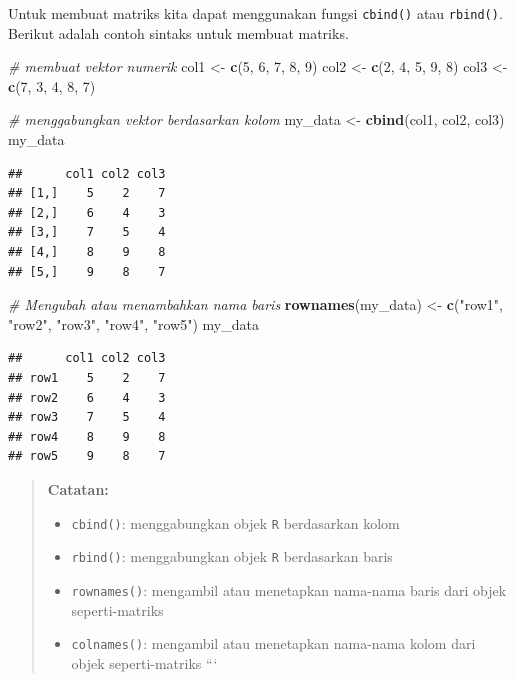 \documentclass[]{book}
\newenvironment{Shaded}{\begin{snugshade}}{\end{snugshade}}
\newcommand{\CommentTok}[1]{\textcolor[rgb]{0.56,0.35,0.01}{\textit{#1}}}
\newcommand{\DecValTok}[1]{\textcolor[rgb]{0.00,0.00,0.81}{#1}}
\newcommand{\KeywordTok}[1]{\textcolor[rgb]{0.13,0.29,0.53}{\textbf{#1}}}
\newcommand{\NormalTok}[1]{#1}
\newcommand{\StringTok}[1]{\textcolor[rgb]{0.31,0.60,0.02}{#1}}
\providecommand{\tightlist}{%
  \setlength{\itemsep}{0pt}\setlength{\parskip}{0pt}}
\theoremstyle{definition}
\theoremstyle{definition}
\theoremstyle{definition}
\theoremstyle{remark}
\begin{document}
Untuk membuat matriks kita dapat menggunakan fungsi \texttt{cbind()} atau \texttt{rbind()}. Berikut adalah contoh sintaks untuk membuat matriks.

\begin{Shaded}
\begin{Highlighting}[]
\CommentTok{# membuat vektor numerik}
\NormalTok{col1 <-}\StringTok{ }\KeywordTok{c}\NormalTok{(}\DecValTok{5}\NormalTok{, }\DecValTok{6}\NormalTok{, }\DecValTok{7}\NormalTok{, }\DecValTok{8}\NormalTok{, }\DecValTok{9}\NormalTok{)}
\NormalTok{col2 <-}\StringTok{ }\KeywordTok{c}\NormalTok{(}\DecValTok{2}\NormalTok{, }\DecValTok{4}\NormalTok{, }\DecValTok{5}\NormalTok{, }\DecValTok{9}\NormalTok{, }\DecValTok{8}\NormalTok{)}
\NormalTok{col3 <-}\StringTok{ }\KeywordTok{c}\NormalTok{(}\DecValTok{7}\NormalTok{, }\DecValTok{3}\NormalTok{, }\DecValTok{4}\NormalTok{, }\DecValTok{8}\NormalTok{, }\DecValTok{7}\NormalTok{)}

\CommentTok{# menggabungkan vektor berdasarkan kolom}
\NormalTok{my_data <-}\StringTok{ }\KeywordTok{cbind}\NormalTok{(col1, col2, col3)}
\NormalTok{my_data}
\end{Highlighting}
\end{Shaded}

\begin{verbatim}
##      col1 col2 col3
## [1,]    5    2    7
## [2,]    6    4    3
## [3,]    7    5    4
## [4,]    8    9    8
## [5,]    9    8    7
\end{verbatim}

\begin{Shaded}
\begin{Highlighting}[]
\CommentTok{# Mengubah atau menambahkan nama baris}
\KeywordTok{rownames}\NormalTok{(my_data) <-}\StringTok{ }\KeywordTok{c}\NormalTok{(}\StringTok{"row1"}\NormalTok{, }\StringTok{"row2"}\NormalTok{, }
                       \StringTok{"row3"}\NormalTok{, }\StringTok{"row4"}\NormalTok{, }
                       \StringTok{"row5"}\NormalTok{)}
\NormalTok{my_data}
\end{Highlighting}
\end{Shaded}

\begin{verbatim}
##      col1 col2 col3
## row1    5    2    7
## row2    6    4    3
## row3    7    5    4
## row4    8    9    8
## row5    9    8    7
\end{verbatim}

\begin{quote}
\textbf{Catatan:}

\begin{itemize}
\tightlist
\item
  \texttt{cbind()}: menggabungkan objek \texttt{R} berdasarkan kolom
\item
  \texttt{rbind()}: menggabungkan objek \texttt{R} berdasarkan baris
\item
  \texttt{rownames()}: mengambil atau menetapkan nama-nama baris dari objek seperti-matriks
\item
  \texttt{colnames()}: mengambil atau menetapkan nama-nama kolom dari objek seperti-matriks
  ```
\end{itemize}
\end{quote}
\end{document}
